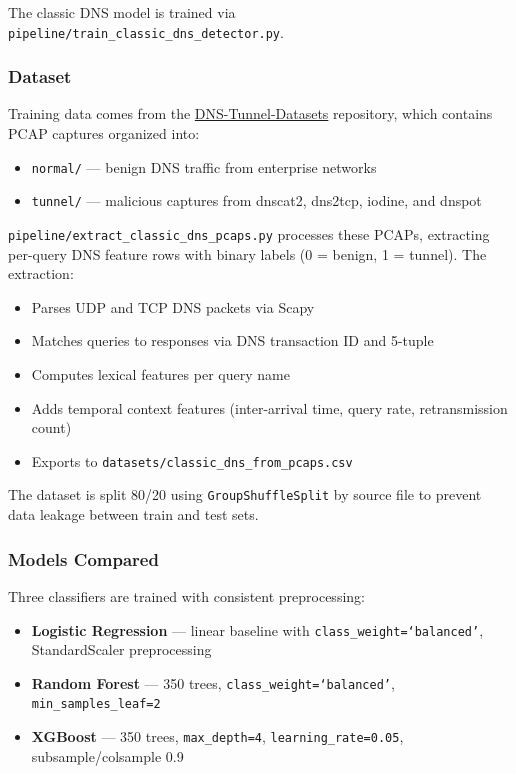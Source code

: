 \documentclass[12pt,a4paper]{article}
\begin{document}
The classic DNS model is trained via \texttt{pipeline/train\_classic\_dns\_detector.py}.

\subsubsection{Dataset}

Training data comes from the \href{https://github.com/ahlashkari/DNS-Tunnel-Datasets}{DNS-Tunnel-Datasets} repository, which contains PCAP captures organized into:
\begin{itemize}
    \item \texttt{normal/} --- benign DNS traffic from enterprise networks
    \item \texttt{tunnel/} --- malicious captures from dnscat2, dns2tcp, iodine, and dnspot
\end{itemize}

\texttt{pipeline/extract\_classic\_dns\_pcaps.py} processes these PCAPs, extracting per-query DNS feature rows with binary labels (0 = benign, 1 = tunnel). The extraction:
\begin{itemize}
    \item Parses UDP and TCP DNS packets via Scapy
    \item Matches queries to responses via DNS transaction ID and 5-tuple
    \item Computes lexical features per query name
    \item Adds temporal context features (inter-arrival time, query rate, retransmission count)
    \item Exports to \texttt{datasets/classic\_dns\_from\_pcaps.csv}
\end{itemize}

The dataset is split 80/20 using \texttt{GroupShuffleSplit} by source file to prevent data leakage between train and test sets.

\subsubsection{Models Compared}

Three classifiers are trained with consistent preprocessing:

\begin{itemize}
    \item \textbf{Logistic Regression} --- linear baseline with \texttt{class\_weight=`balanced'}, StandardScaler preprocessing
    \item \textbf{Random Forest} --- 350 trees, \texttt{class\_weight=`balanced'}, \texttt{min\_samples\_leaf=2}
    \item \textbf{XGBoost} --- 350 trees, \texttt{max\_depth=4}, \texttt{learning\_rate=0.05}, subsample/colsample 0.9
\end{itemize}
\end{document}
